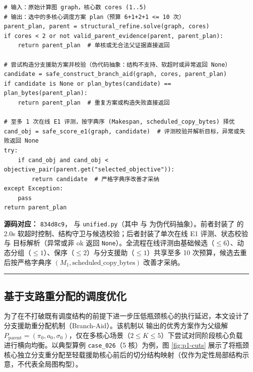 \documentclass[anonymous,withtoc]{gmcm2026}
\begin{document}
\begin{lstlisting}[style=paperpseudo]
# 输入：原始计算图 graph，核心数 cores (1..5)
# 输出：选中的多核心调度方案 plan（预算 6+1+2+1 <= 10 次）
parent_plan, parent = structural_refine.solve(graph, cores)
if cores < 2 or not valid_parent_evidence(parent, parent_plan):
    return parent_plan  # 单核或无合法父证据直接返回

# 尝试构造分支援助方案并校验（伪代码抽象：结构不支持、软超时或异常返回 None）
candidate = safe_construct_branch_aid(graph, cores, parent_plan)
if candidate is None or plan_bytes(candidate) == plan_bytes(parent_plan):
    return parent_plan  # 重复方案或构造失败直接返回

# 至多 1 次在线 E1 评测，按字典序 (Makespan, scheduled_copy_bytes) 择优
cand_obj = safe_score_e1(graph, candidate)  # 评测校验并解析目标，异常或失败返回 None
try:
    if cand_obj and cand_obj < objective_pair(parent.get("selected_objective")):
        return candidate  # 严格字典序改善才采纳
except Exception:
    pass
return parent_plan
\end{lstlisting}
\textbf{源码对应：} \texttt{834d8c9}，\texttt{} 与 \texttt{unified.py}（其中 \texttt{} 与 \texttt{} 为伪代码抽象）。前者封装了 \texttt{} 的 2.0s 软超时控制、结构守卫与候选校验；后者封装了单次在线 E1 评测、状态校验与 \texttt{} 目标解析（异常或非 ok 返回 \texttt{None}）。全流程在线评测由基础候选（\(\le 6\)）、动态分组（\(\le 1\)）、保序（\(\le 2\)）与分支援助（\(\le 1\)）共享至多 10 次预算，候选去重后按严格字典序 \((M_1, \text{scheduled\_copy\_bytes})\) 改善才采纳。

\par\hrule\endgroup

\subsection{基于支路重分配的调度优化}

为了在不打破既有调度结构的前提下进一步压低瓶颈核心的执行延迟，本文设计了分支援助重分配机制（Branch-Aid）。该机制以 \texttt{} 输出的优秀方案作为父级解 \(P_{\mathrm{parent}} = (\pi_0, a_0, \sigma_0)\)，仅在多核心场景（\(2 \le K \le 5\)）下尝试对同阶段核心负载进行横向均衡。以典型算例 \texttt{case\_026}（5 核）为例，图 \ref{fig:p1-cuts} 展示了将瓶颈核心独立分支重分配至轻载援助核心前后的切分结构映射（仅作为定性局部结构示意，不代表全局图构型）。
\end{document}
